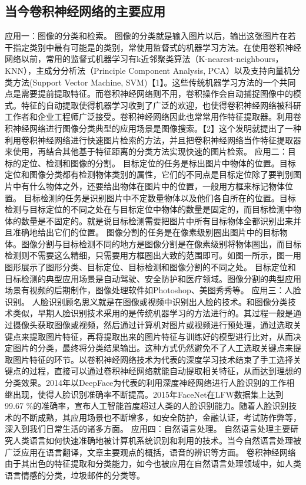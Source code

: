 \subsection{当今卷积神经网络的主要应用}
应用一：图像的分类和检索。
图像的分类就是输入图片以后，输出这张图片在若干指定类别中最有可能是的类别，常使用监督式的机器学习方法。在使用卷积神经网络以前，常用的监督式机器学习有k近邻聚类算法（K-nearest-neighbours，KNN），主成分分析法（Principle Component Analysis, PCA）以及支持向量机分类方法(Support Vector Machine, SVM)【1】。这些传统机器学习方法的一个共同点是需要提前提取特征。而卷积神经网络则不用，卷积操作会自动捕捉图像中的模式。特征的自动提取使得机器学习收到了广泛的欢迎，也使得卷积神经网络被科研工作者和企业工程师广泛接受。卷积神经网络因此也常常用作特征提取器。利用卷积神经网络进行图像分类典型的应用场景是图像搜索。【2】这个发明就提出了一种利用卷积神经网络进行快速图片检索的方法，并且把卷积神经网络当作特征提取器来使用，再结合其他基于特征距离的分类方法实现快速的图片检索。
应用二：目标的定位、检测和图像的分割。
目标定位的任务是标出图片中物体的位置。目标定位和图像分类都有检测物体类别的属性，它们的不同点是目标定位除了要判别图片中有什么物体之外，还要给出物体在图片中的位置，一般用方框来标记物体位置。
目标检测的任务是识别图片中不定数量物体以及他们各自所在的位置。目标检测与目标定位的不同之处在与目标定位中物体的数量是固定的，而目标检测中物体的数量是不固定的。就是说目标检测需要把图片中所有目标物体全都识别出来并且准确地给出它们的位置。
图像分割的任务是在像素级别圈出图片中的目标物体。图像分割与目标检测不同的地方是图像分割是在像素级别将物体圈出，而目标检测则不需要这么精细，只需要用方框圈出大致的范围即可。如图一所示，图一用图形展示了图形分类、目标定位、目标检测和图像分割的不同之处。
目标定位和目标检测的典型应用场景是自动驾驶、安全防护和医疗领域。图像分割的典型应用场景有视频的后期制作，图像处理软件如Photoshop、美图秀秀等。
应用三：人脸识别。
人脸识别顾名思义就是在图像或视频中识别出人脸的技术。和图像分类技术类似，早期人脸识别技术采用的是传统机器学习的方法进行的。其过程一般是通过摄像头获取图像或视频，然后通过计算机对图片或视频进行预处理，通过选取关键点来提取图片特征，再将提取出来的图片特征与训练好的模型进行比对，从而决定图片的分类，最终将分类结果输出。这种方式仍然避免不了人工选取关键点来提取图片特征的环节。以卷积神经网络技术为代表的深度学习技术结束了手工选择关键点的过程，直接可以通过卷积神经网络就能自动提取相关特征，从而达到理想的分类效果。2014年以DeepFace为代表的利用深度神经网络进行人脸识别的工作相继出现，使得人脸识别准确率不断提高。2015年FaceNet在LFW数据集上达到99.67 $\%$的准确率，宣布人工智能首度超过人类的人脸识别能力。随着人脸识别技术的不断成熟，其应用场景也不断增多，如安全防护，金融认证，考试防作弊等，深入到我们日常生活的诸多方面。
应用四：自然语言处理。
自然语言处理主要研究人类语言如何快速准确地被计算机系统识别和利用的技术。当今自然语言处理被广泛应用在语言翻译，文章主要观点的概括，语音的辨识等方面。
卷积神经网络由于其出色的特征提取和分类能力，如今也被应用在自然语言处理领域中，如人类语言情感的分类，垃圾邮件的分类等。

